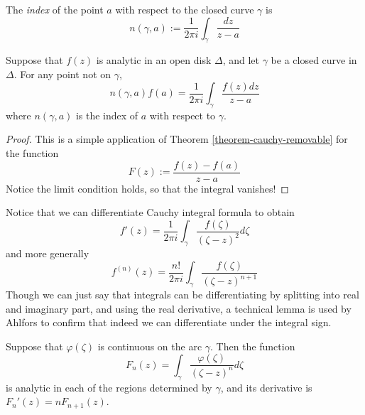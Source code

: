 \begin{definition}
\label{definition-index}
The {\it index} of the point $a$ with respect to the closed curve $\gamma$ is
\begin{equation}
\label{equation-index}
n(\gamma,a):=\frac{1}{2\pi i}\int_\gamma\frac{dz}{z-a}
\end{equation}
\end{definition}

\begin{theorem}
\label{theorem-cauchy-integral-formula}
\begin{reference}
\cite[Section 2.2, Theorem 6]{ahl}
\end{reference}
Suppose that $f(z)$ is analytic in an open disk $\Delta$, and let $\gamma$ be a
closed curve in $\Delta$. For any point not on $\gamma$,
\begin{equation}
\label{equation-cauchy-integral-formula}
n(\gamma,a)f(a)=\frac{1}{2\pi i}\int_\gamma\frac{f(z)dz}{z-a}
\end{equation}
where $n(\gamma,a)$ is the index of $a$ with respect to $\gamma$.
\end{theorem}

\begin{proof}
This is a simple application of Theorem \ref{theorem-cauchy-removable} for the
function
$$
F(z):=\frac{f(z)-f(a)}{z-a}
$$
Notice the limit condition holds, so that the integral vanishes!
\end{proof}

\noindent
Notice that we can differentiate Cauchy integral formula to obtain
\begin{equation}
\label{equation-first-derivativecauchy-formula}
f'(z)=\frac{1}{2\pi i}\int_\gamma\frac{f(\zeta)}{(\zeta-z)^2}d\zeta
\end{equation}
and more generally
$$
f^{(n)}(z)=\frac{n!}{2\pi i}\int_\gamma \frac{f(\zeta)}{(\zeta-z)^{n+1}}
$$
Though we can just say that integrals can be differentiating by splitting into
real and imaginary part, and using the real derivative, a technical lemma is 
used by Ahlfors to confirm that indeed we can differentiate
under the integral sign.

\begin{lemma}
\label{lemma-differentiation-of-integral}
Suppose that $\varphi(\zeta)$ is continuous on the arc $\gamma$.
Then the function
$$
F_n(z)=\int_\gamma \frac{\varphi(\zeta)}{(\zeta-z)^n}d\zeta
$$
is analytic in each of the regions determined by $\gamma$,
and its derivative is $F_n'(z)=nF_{n+1}(z)$.
\end{lemma}

